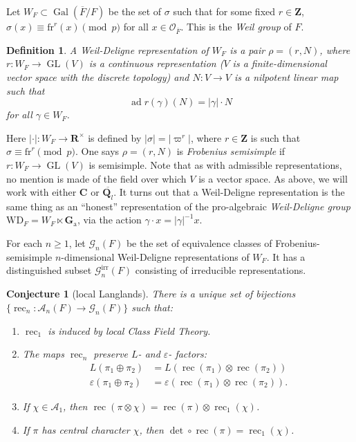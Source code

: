 \documentclass{article}
\DeclareMathOperator{\adjoint}{ad}
\DeclareMathOperator{\galois}{Gal}
\DeclareMathOperator{\GL}{GL}
\DeclareMathOperator{\reciprocity}{rec}
\newcommand{\frob}{\mathrm{fr}} %
\newcommand{\Ga}{\mathbf{G}_\mathrm{a}}
\newcommand{\WD}{\mathrm{WD}} %
\newcommand{\cA}{\mathcal{A}}
\newcommand{\cG}{\mathcal{G}}
\newcommand{\cO}{\mathcal{O}}
\newcommand{\dC}{\mathbf{C}}
\newcommand{\dQ}{\mathbf{Q}}
\newcommand{\dR}{\mathbf{R}}
\newcommand{\dZ}{\mathbf{Z}}
\newtheorem{conjecture}[subsection]{Conjecture}
\newtheorem{definition}[subsection]{Definition}
\begin{document}
Let $W_F\subset\galois(\overline F/F)$ be the set of $\sigma$ such that 
for some fixed $r\in \dZ$, $\sigma(x)\equiv \frob^r(x)\pmod p$ for all 
$x\in \cO_{\overline F}$. This is the \emph{Weil group} of $F$. 

\begin{definition}
A \emph{Weil-Deligne representation} of $W_F$ is a pair $\rho=(r,N)$, where 
$r:W_F\to \GL(V)$ is a continuous representation ($V$ is a finite-dimensional 
vector space with the discrete topology) and $N:V\to V$ is a nilpotent linear 
map such that 
\[
  \adjoint r(\gamma)(N) = |\gamma|\cdot N 
\]
for all $\gamma\in W_F$. 
\end{definition}

Here $|\cdot|:W_F\to \dR^\times$ is defined by $|\sigma|=|\varpi^r|$, where 
$r\in \dZ$ is such that $\sigma\equiv \frob^r\pmod p$. One says 
$\rho=(r,N)$ is \emph{Frobenius semisimple} if $r:W_F\to \GL(V)$ is semisimple. 
Note that as with admissible representations, no mention is made of the field 
over which $V$ is a vector space. As above, we will work with either $\dC$ or 
$\overline{\dQ_l}$. It turns out that a Weil-Deligne representation is the same 
thing as an ``honest'' representation of the pro-algebraic \emph{Weil-Deligne 
group} $\WD_F=W_F\ltimes \Ga$, via the action 
$\gamma\cdot x = |\gamma|^{-1} x$. 

For each $n\geqslant 1$, let $\cG_n(F)$ be the set of equivalence classes of 
Frobenius-semisimple $n$-dimensional Weil-Deligne representations of $W_F$. It 
has a distinguished subset $\cG_n^\mathrm{irr}(F)$ consisting of irreducible 
representations. 

\begin{conjecture}[local Langlands]\label{conj:local-langlands}
There is a unique set of bijections $\{\reciprocity_n:\cA_n(F)\to \cG_n(F)\}$ 
such that: 
\begin{enumerate}
\item $\reciprocity_1$ is induced by local Class Field Theory. 

\item The maps $\reciprocity_n$ preserve $L$- and $\varepsilon$- factors: 
\begin{align*}
  L(\pi_1\oplus \pi_2) 
    &= L(\reciprocity(\pi_1)\otimes \reciprocity(\pi_2)) \\
  \varepsilon(\pi_1\oplus \pi_2) 
    &= \varepsilon(\reciprocity(\pi_1)\otimes \reciprocity(\pi_2)) .
\end{align*}

\item If $\chi\in \cA_1$, then 
$\reciprocity(\pi\otimes \chi)=\reciprocity(\pi)\otimes \reciprocity_1(\chi)$. 

\item If $\pi$ has central character $\chi$, then 
$\det\circ \reciprocity(\pi) = \reciprocity_1(\chi)$. 
\end{enumerate}
\end{conjecture}
\end{document}
